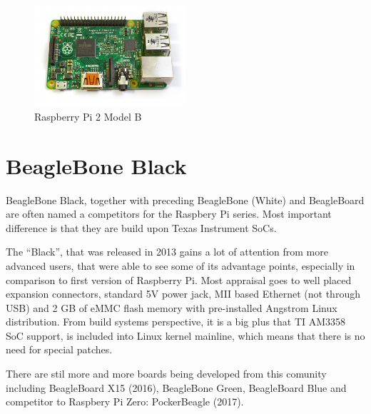 \documentclass[printmode]{mgr}
\begin{document}
\begin{figure}[htbp]
  \centering
    \includegraphics[width=0.5\textwidth]{raspberrypi2-front.jpg}
  \caption{Raspberry Pi 2 Model B}
  \label{fig:devboard-raspberrypi2}
\end{figure}






\section{BeagleBone Black}

BeagleBone Black, together with preceding BeagleBone (White) and BeagleBoard are often named a competitors for the Raspbery Pi series.
Most important difference is that they are build upon Texas Instrument SoCs.

The ``Black'', that was released in 2013 gains a lot of attention from more advanced users, that were able to see some of its advantage points, especially in comparison to first version of Raspberry Pi.
Most appraisal goes to well placed expansion connectors, standard 5V power jack, MII based Ethernet (not through USB) and 2 GB of eMMC flash memory with pre-installed Angstrom Linux distribution.
From build systems perspective, it is a big plus that TI AM3358 SoC support, is included into Linux kernel mainline, which means that there is no need for special patches.

There are stil more and more boards being developed from this comunity including BeagleBoard X15 (2016), BeagleBone Green, BeagleBoard Blue and competitor to Raspbery Pi Zero: PockerBeagle (2017).
\end{document}
